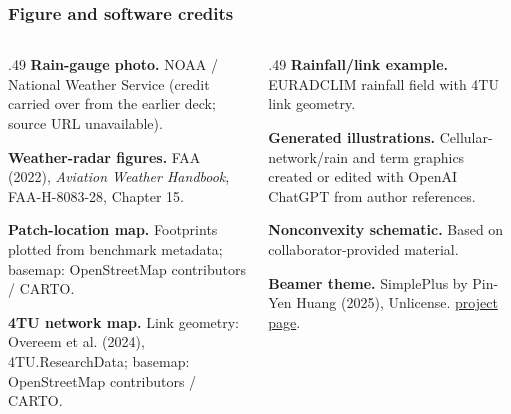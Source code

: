 \documentclass[aspectratio=169]{beamer}
\newcommand{\slidetitle}[1]{\frametitle{#1}}
\begin{document}
\begin{frame}[t]
\slidetitle{Figure and software credits}
\begin{columns}[T,onlytextwidth]
\begin{column}{.49\textwidth}
\small
\textbf{Rain-gauge photo.} NOAA / National Weather Service (credit carried over from the earlier deck; source URL unavailable).\par\smallskip
\textbf{Weather-radar figures.} FAA (2022), \emph{Aviation Weather Handbook}, FAA-H-8083-28, Chapter 15.\par\smallskip
\textbf{Patch-location map.} Footprints plotted from benchmark metadata; basemap: OpenStreetMap contributors / CARTO.\par\smallskip
\textbf{4TU network map.} Link geometry: Overeem et al. (2024), 4TU.ResearchData; basemap: OpenStreetMap contributors / CARTO.\par\smallskip
\end{column}
\begin{column}{.49\textwidth}
\small
\textbf{Rainfall/link example.} EURADCLIM rainfall field with 4TU link geometry.\par\smallskip
\textbf{Generated illustrations.} Cellular-network/rain and term graphics created or edited with OpenAI ChatGPT from author references.\par\smallskip
\textbf{Nonconvexity schematic.} Based on collaborator-provided material.\par\smallskip
\textbf{Beamer theme.} SimplePlus by Pin-Yen Huang (2025), Unlicense. \href{https://github.com/PM25/SimplePlus-BeamerTheme}{project page}.\par\smallskip
\end{column}
\end{columns}
\end{frame}
\end{document}
